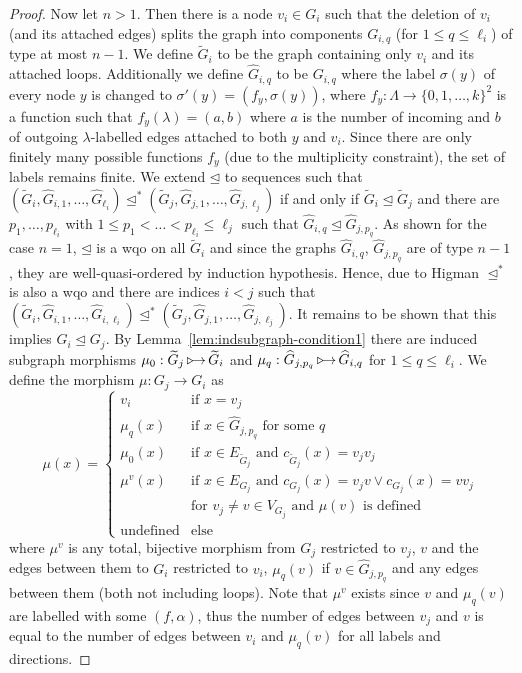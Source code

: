 \documentclass{llncs}
\newcommand{\indsubArrow}{\mathop{\textnormal{\texttt{$\triangleright$}}\;\!\!\!\!\to}}
\newcommand{\indsubOrder}{\unlhd}
\begin{document}
{\begin{proof}
Now let $n > 1$. Then there is a node $v_i \in G_i$ such that the
deletion of $v_i$ (and its attached edges) splits the graph into
components $G_{i,q}$ (for $1 \leq q \leq \ell_i$) of type at most
$n-1$. We define $\widetilde{G}_i$ to be the graph containing only
$v_i$ and its attached loops. Additionally we define
$\widehat{G}_{i,q}$ to be $G_{i,q}$ where the label $\sigma(y)$ of
every node $y$ is changed to $\sigma'(y) = (f_y,\sigma(y))$, where
$f_y: \Lambda \to \{0,1,\ldots,k\}^2$ is a function such that
$f_y(\lambda) = (a,b)$ where $a$ is the number of incoming and $b$ of
outgoing $\lambda$-labelled edges attached to both $y$ and $v_i$.
Since there are only finitely many possible functions $f_y$ (due to
the multiplicity constraint), the set of labels remains finite. We
extend $\indsubOrder$ to sequences such that $(\widetilde{G}_i,
\widehat{G}_{i,1}, \ldots, \widehat{G}_{\ell_i}) \indsubOrder^*
(\widetilde{G}_j, \widehat{G}_{j,1}, \ldots, \widehat{G}_{j,\ell_j})$
if and only if $\widetilde{G}_i \indsubOrder \widetilde{G}_j$ and
there are $p_1, \ldots, p_{\ell_i}$ with $1 \leq p_1 < \ldots <
p_{\ell_i} \leq \ell_j$ such that $\widehat{G}_{i,q} \indsubOrder
\widehat{G}_{j,p_q}$.  As shown for the case $n = 1$, $\indsubOrder$
is a wqo on all $\widetilde{G}_i$ and since the graphs
$\widehat{G}_{i,q}$, $\widehat{G}_{j,p_q}$ are of type $n-1$, they are
well-quasi-ordered by induction hypothesis. Hence, due to Higman
\cite{higman1952-divisibility} $\indsubOrder^*$ is also a wqo and
there are indices $i < j$ such that $(\widetilde{G}_i,
\widehat{G}_{i,1}, \ldots, \widehat{G}_{i,\ell_i}) \indsubOrder^*
(\widetilde{G}_j, \widehat{G}_{j,1}, \ldots, \widehat{G}_{j,\ell_j})$.
It remains to be shown that this implies $G_i \indsubOrder G_j$.  By
Lemma~\ref{lem:indsubgraph-condition1} there are induced subgraph
morphisms $\mu_0 : \widetilde{G}_j \indsubArrow \widetilde{G}_i$ and
$\mu_q : \widehat{G}_{j,p_q} \indsubArrow \widehat{G}_{i,q}$ for $1
\leq q \leq \ell_i$. We define the morphism $\mu : G_j \to G_i$ as
\[\mu(x) = \begin{cases}
v_i & \text{if } x = v_j\\
\mu_q(x) & \text{if } x \in \widehat{G}_{j,p_q} \text{ for some } q\\
\mu_0(x) & \text{if } x \in E_{\widetilde{G}_j} \text{ and } 
c_{\widetilde{G}_j}(x) = v_jv_j\\
\mu^v(x) & \text{if } x \in E_{G_j} \text{ and } c_{G_j}(x) = v_jv \lor 
c_{G_j}(x) = vv_j\\
& \text{for } v_j \neq v  \in V_{G_j} \text{ and } \mu(v) \text{ is defined}\\
\text{undefined} & \text{else}
\end{cases}\]
where $\mu^v$ is any total, bijective morphism from $G_j$ restricted to $v_j$, 
$v$ and the edges between them to $G_i$ restricted to $v_i$, $\mu_q(v)$ if $v 
\in \widehat{G}_{j,p_q}$ and any edges between them (both not including 
loops). Note that $\mu^v$ exists since $v$ and $\mu_q(v)$ are labelled with 
some $(f,\alpha)$, thus the number of edges between $v_j$ and $v$ is equal to 
the number of edges between $v_i$ and $\mu_q(v)$ for all labels and directions.


\end{proof}}
\end{document}
